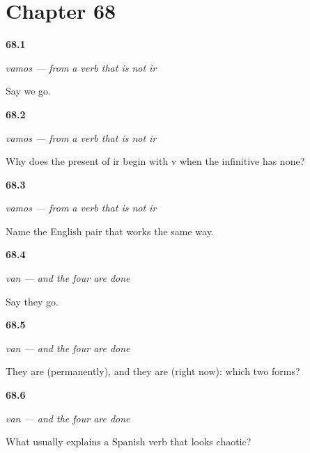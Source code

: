 \section*{Chapter 68}

\noindent\begin{minipage}[t]{\linewidth}
\raggedright
\hypertarget{review-ES-C10-vamos-form}{\textbf{68.1}} \emph{vamos — from a verb that is not \emph{ir}}\par
\small Say we go.
\end{minipage}\par\medskip

\noindent\begin{minipage}[t]{\linewidth}
\raggedright
\hypertarget{review-ES-C10-vamos-why}{\textbf{68.2}} \emph{vamos — from a verb that is not \emph{ir}}\par
\small Why does the present of ir begin with v when the infinitive has none?
\end{minipage}\par\medskip

\noindent\begin{minipage}[t]{\linewidth}
\raggedright
\hypertarget{review-ES-C10-vamos-english}{\textbf{68.3}} \emph{vamos — from a verb that is not \emph{ir}}\par
\small Name the English pair that works the same way.
\end{minipage}\par\medskip

\noindent\begin{minipage}[t]{\linewidth}
\raggedright
\hypertarget{review-ES-C10-van-form}{\textbf{68.4}} \emph{van — and the four are done}\par
\small Say they go.
\end{minipage}\par\medskip

\noindent\begin{minipage}[t]{\linewidth}
\raggedright
\hypertarget{review-ES-C10-van-four}{\textbf{68.5}} \emph{van — and the four are done}\par
\small They are (permanently), and they are (right now): which two forms?
\end{minipage}\par\medskip

\noindent\begin{minipage}[t]{\linewidth}
\raggedright
\hypertarget{review-ES-C10-van-lesson}{\textbf{68.6}} \emph{van — and the four are done}\par
\small What usually explains a Spanish verb that looks chaotic?
\end{minipage}\par\medskip

